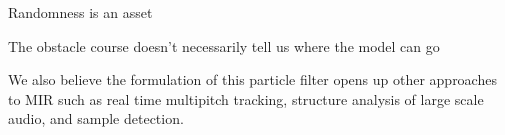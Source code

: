\documentclass{article}
\begin{document}
Randomness is an asset

The obstacle course doesn't necessarily tell us where the model can go

We also believe the formulation of this particle filter opens up other approaches to MIR such as real time multipitch tracking, structure analysis of large scale audio, and sample detection.



%
%
%
%
%
\end{document}
